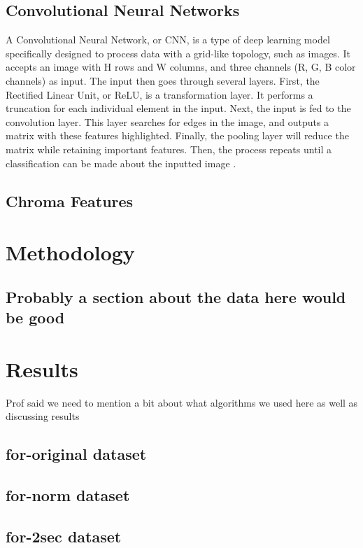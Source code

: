 \documentclass[conference]{IEEEtran}
\begin{document}
\subsection{Convolutional Neural Networks}
A Convolutional Neural Network, or CNN, is a type of deep learning model specifically designed to process data with a grid-like topology, such as images. It accepts an image with H rows and W columns, and three channels (R, G, B color channels) as input. The input then goes through several layers. First, the Rectified Linear Unit, or ReLU, is a transformation layer. It performs a truncation for each individual element in the input. Next, the input is fed to the convolution layer. This layer searches for edges in the image, and outputs a matrix with these features highlighted. Finally, the pooling layer will reduce the matrix while retaining important features. Then, the process repeats until a classification can be made about the inputted image \cite{wu2017introduction}.

\subsection{Chroma Features}

\section{Methodology}

\subsection{Probably a section about the data here would be good}

\section{Results}

Prof said we need to mention a bit about what algorithms we used here as well as discussing results

\subsection{for-original dataset}

\subsection{for-norm dataset}

\subsection{for-2sec dataset}
\end{document}
